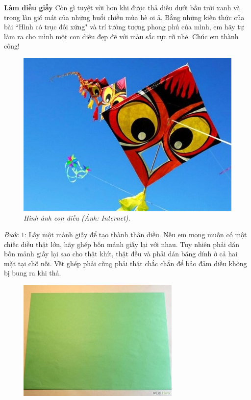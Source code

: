 \begin{multicols}{2}
	\textbf{\color{toancuabi}Làm diều giấy}
	\vskip 0.1cm
	Còn gì tuyệt vời hơn khi được thả diều dưới bầu trời xanh và trong làn gió mát của những buổi chiều mùa hè oi ả. Bằng những kiến thức của bài ``Hình có trục đối xứng" và trí tưởng tượng phong phú của mình, em hãy tự làm ra cho mình một con diều đẹp đẽ với màu sắc rực rỡ nhé. Chúc em thành công!
	\begin{figure}[H]
		\vspace*{-5pt}
		\centering
		\captionsetup{labelformat= empty, justification=centering}
		\includegraphics[width= 1\linewidth]{1}
		\caption{\small\textit{\color{toancuabi}Hình ảnh con diều (Ảnh: Internet).}}
		\vspace*{-10pt}
	\end{figure}
	\textit{Bước} $1$: Lấy một mảnh giấy để tạo thành thân diều. Nếu em mong muốn có một chiếc diều thật lớn, hãy ghép bốn mảnh giấy lại với nhau. Tuy nhiên phải dán bốn mảnh giấy lại sao cho thật khít, thật đều và phải dán băng dính ở cả hai mặt tại chỗ nối. Vết ghép phải cũng phải thật chắc chắn để bảo đảm diều không bị bung ra khi thả.
	\begin{figure}[H]
		\vspace*{5pt}
		\centering
		\captionsetup{labelformat= empty, justification=centering}
		\includegraphics[width= 1\linewidth]{2}

\end{figure}
\end{multicols}
